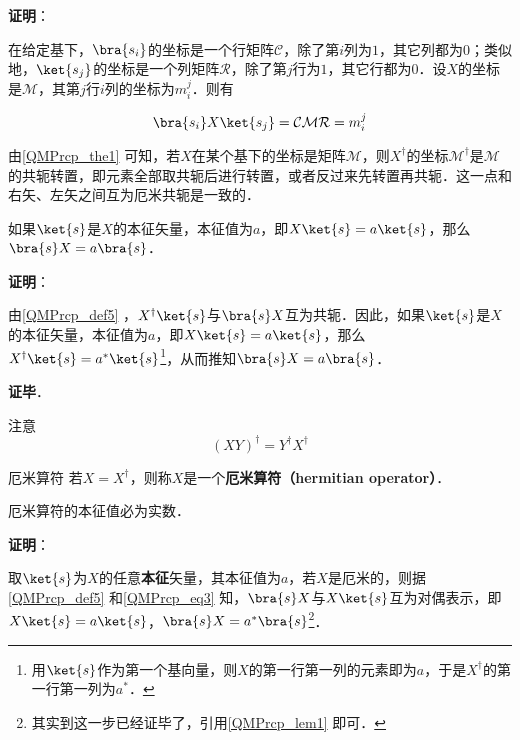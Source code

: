 \textbf{证明}：

在给定基下，$\bra{s_i}$的坐标是一个行矩阵$\mathcal{C}$，除了第$i$列为$1$，其它列都为$0$；类似地，$\ket{s_j}$的坐标是一个列矩阵$\mathcal{R}$，除了第$j$行为$1$，其它行都为$0$．设$X$的坐标是$\mathcal{M}$，其第$j$行$i$列的坐标为$m^j_i$．则有

\begin{equation}
\bra{s_i}X\ket{s_j} = \mathcal{CMR} = m^j_i
\end{equation}







由\autoref{QMPrcp_the1} 可知，若$X$在某个基下的坐标是矩阵$\mathcal{M}$，则$X^\dagger$的坐标$\mathcal{M}^\dagger$是$\mathcal{M}$的共轭转置，即元素全部取共轭后进行转置，或者反过来先转置再共轭．这一点和右矢、左矢之间互为厄米共轭是一致的．






\begin{lemma}{}\label{QMPrcp_lem1}
如果$\ket{s}$是$X$的本征矢量，本征值为$a$，即$X\ket{s}=a\ket{s}$，那么$\bra{s}X=a\bra{s}$．
\end{lemma}

\textbf{证明}：

由\autoref{QMPrcp_def5} ，$X^\dagger\ket{s}$与$\bra{s}X$互为共轭．因此，如果$\ket{s}$是$X$的本征矢量，本征值为$a$，即$X\ket{s}=a\ket{s}$，那么$X^\dagger\ket{s}=a^*\ket{s}$\footnote{用$\ket{s}$作为第一个基向量，则$X$的第一行第一列的元素即为$a$，于是$X^\dagger$的第一行第一列为$a^*$．}，从而推知$\bra{s}X=a\bra{s}$．

\textbf{证毕}．




注意
\begin{equation}
(XY)^\dagger = Y^\dagger X^\dagger
\end{equation}


\begin{definition}{厄米算符}\label{QMPrcp_def12}
若$X=X^\dagger$，则称$X$是一个\textbf{厄米算符（hermitian operator）}．
\end{definition}

\begin{theorem}{}\label{QMPrcp_the2}
厄米算符的本征值必为实数．
\end{theorem}

\textbf{证明}：

取$\ket{s}$为$X$的任意\textbf{本征}矢量，其本征值为$a$，若$X$是厄米的，则据\autoref{QMPrcp_def5} 和\autoref{QMPrcp_eq3} 知，$\bra{s}X$与$X\ket{s}$互为对偶表示，即$X\ket{s}=a\ket{s}$，$\bra{s}X=a^*\bra{s}$\footnote{其实到这一步已经证毕了，引用\autoref{QMPrcp_lem1} 即可．}．

